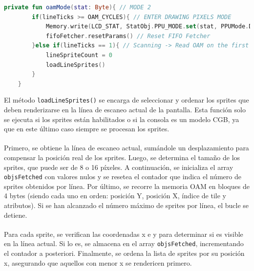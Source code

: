 \begin{lstlisting}[language=Kotlin, caption={Lógica del proceso de OAM Scan.}, label={code:ppuoamscan}]
    private fun oamMode(stat: Byte){ // MODE 2
        if(lineTicks >= OAM_CYCLES){ // ENTER DRAWING PIXELS MODE
            Memory.write(LCD_STAT, StatObj.PPU_MODE.set(stat, PPUMode.DRAW_LCD.number))
            fifoFetcher.resetParams() // Reset FIFO Fetcher
        }else if(lineTicks == 1){ // Scanning -> Read OAM on the first tick
            lineSpriteCount = 0
            loadLineSprites()
        }
    }
\end{lstlisting}

El método \texttt{loadLineSprites()} se encarga de seleccionar y ordenar los sprites que deben renderizarse en la línea de escaneo actual de la pantalla. Esta función solo se ejecuta si los sprites están habilitados o si la consola es un modelo CGB, ya que en este último caso siempre se procesan los sprites.
\\\\
Primero, se obtiene la línea de escaneo actual, sumándole un desplazamiento para compensar la posición real de los sprites. Luego, se determina el tamaño de los sprites, que puede ser de 8 o 16 píxeles. A continuación, se inicializa el array \texttt{objsFetched} con valores nulos y se resetea el contador que indica el número de sprites obtenidos por línea. Por último, se recorre la memoria OAM en bloques de 4 bytes (siendo cada uno en orden: posición Y, posición X, índice de tile y atributos). Si se han alcanzado el número máximo de sprites por línea, el bucle se detiene.
\\\\
Para cada sprite, se verifican las coordenadas x e y para determinar si es visible en la línea actual. Si lo es, se almacena en el array \texttt{objsFetched}, incrementando el contador a posteriori. Finalmente, se ordena la lista de sprites por su posición x, asegurando que aquellos con menor x se rendericen primero.

